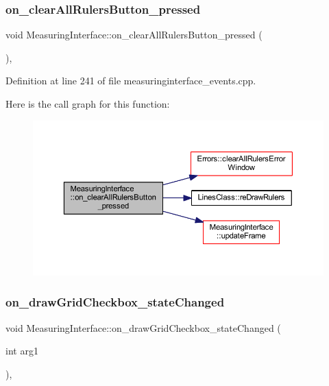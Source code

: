 \subsubsection{\texorpdfstring{on\_clearAllRulersButton\_pressed}{on\_clearAllRulersButton\_pressed}}
{\footnotesize\ttfamily void Measuring\+Interface\+::on\+\_\+clear\+All\+Rulers\+Button\+\_\+pressed (\begin{DoxyParamCaption}{ }\end{DoxyParamCaption})\hspace{0.3cm}{\ttfamily [private]}, {\ttfamily [slot]}}



Definition at line 241 of file measuringinterface\+\_\+events.\+cpp.

Here is the call graph for this function\+:
\nopagebreak
\begin{figure}[H]
\begin{center}
\leavevmode
\includegraphics[width=350pt]{classMeasuringInterface_a423a52e80d530b4cf1154422b3de5073_cgraph}
\end{center}
\end{figure}
\mbox{\label{classMeasuringInterface_a37da2b051cdaef7769ac1f1f8a849753}} 
\subsubsection{\texorpdfstring{on\_drawGridCheckbox\_stateChanged}{on\_drawGridCheckbox\_stateChanged}}
{\footnotesize\ttfamily void Measuring\+Interface\+::on\+\_\+draw\+Grid\+Checkbox\+\_\+state\+Changed (\begin{DoxyParamCaption}\item[{int}]{arg1 }\end{DoxyParamCaption})\hspace{0.3cm}{\ttfamily [private]}, {\ttfamily [slot]}}



